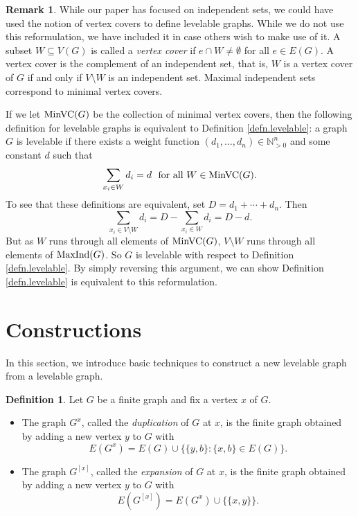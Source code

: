 \documentclass[12pt]{amsart}
\numberwithin{equation}{section}
\theoremstyle{definition}
\newtheorem{definition}[theorem]{Definition}
\newtheorem{remark}[theorem]{Remark}
\newcounter{i} %
\begin{document}
\begin{remark}
While our paper has focused on independent sets, 
we could have  used the notion of vertex covers 
to define levelable graphs. While we do not
use this reformulation, we have included it in
case others wish to make use of it.
A subset $W \subseteq V(G)$ is called a {\it vertex cover} if $e \cap W 
\neq \emptyset$ for all $e \in E(G)$.     A vertex cover is the complement
of an independent set, that is, $W$ is a vertex
cover of $G$ if and only
if $V\setminus W$ is an independent set.  Maximal independent sets correspond
to minimal vertex covers.  

If we let ${\rm MinVC}(G)$ be the collection of minimal vertex covers, then
the following definition for levelable graphs is equivalent to Definition \ref{defn.levelable}: a graph $G$ is levelable if there exists
a weight function $(d_1,\ldots,d_n) \in \mathbb{N}^n_{> 0}$ and some constant $d$ such that
\[\sum_{x_i \in W} d_i = d ~~\mbox{for all $W \in {\rm MinVC}(G)$}.\]
To see that these definitions are equivalent, set $D = d_1+\cdots+d_n$. Then
\[ \sum_{x_i \in V\setminus W} d_i = D - \sum_{x_i \in W} d_i = D-d.\]
But as $W$ runs through all elements of ${\rm MinVC}(G)$, 
$V\setminus W$ runs through all elements of ${\rm MaxInd}(G)$.  So
$G$ is levelable with respect to Definition \ref{defn.levelable}. By
simply reversing this argument, we can show Definition \ref{defn.levelable}
is equivalent to this reformulation.
\end{remark}





\section{Constructions} 
In this section, we introduce basic techniques to construct a new levelable graph from a levelable graph.

\begin{definition}
Let $G$ be a finite graph and fix a vertex $x$ of $G$.  

\begin{itemize}
    \item 
The graph $G^x$, called the {\it duplication} of $G$ at $x$, is the finite graph obtained by adding a new vertex $y$ to $G$ with
\[
E(G^x) = E(G) \cup \{\{y, b\} : \{x, b\} \in E(G)\}.
\]
\item
The graph $G^{[x]}$, called the {\it expansion} of $G$ at $x$, is the finite graph obtained by adding a new vertex $y$ to $G$ with 
\[
E(G^{[x]}) = E(G^x) \cup \{\{x,y\}\}.
\]  
\end{itemize}
\end{definition}
\end{document}

